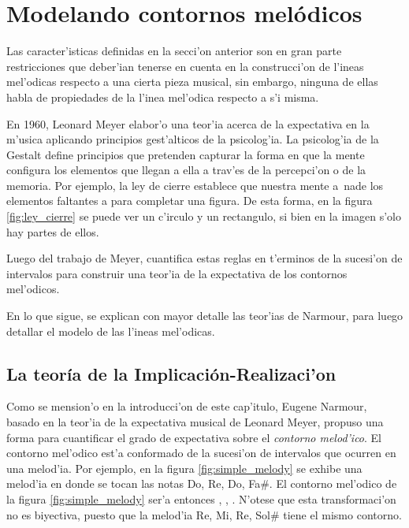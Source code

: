 \section{Modelando contornos mel\'odicos}
\label{sec:melodic_contour}
Las caracter'isticas definidas en la secci'on anterior son en gran parte restricciones que deber'ian tenerse en cuenta en la construcci'on 
de l'ineas mel'odicas respecto a una cierta pieza musical, sin embargo, ninguna de ellas habla de propiedades de la l'inea mel'odica 
respecto a s'i misma.

En 1960, Leonard Meyer elabor'o una teor'ia acerca de la expectativa en la m'usica aplicando principios gest'alticos de la psicolog'ia. La 
psicolog'ia de la Gestalt define principios que pretenden capturar la forma en que la mente configura los elementos que llegan a ella a trav'es 
de la percepci'on o de la memoria. Por ejemplo, la ley de cierre establece que nuestra mente a~nade los elementos faltantes a para completar una 
figura. De esta forma, en la figura \ref{fig:ley_cierre} se puede ver un c'irculo y un rectangulo, si bien en la imagen s'olo hay partes de ellos.

\begin{imagen}
    \width{6cm}
\end{imagen}

Luego del trabajo de Meyer, \cite{Narmour91} cuantifica estas reglas en t'erminos de la sucesi'on de intervalos para construir una teor'ia de 
la expectativa de los contornos mel'odicos. 

En lo que sigue, se explican con mayor detalle las teor'ias de Narmour, para luego detallar el modelo de las l'ineas mel'odicas.

\subsection{La teor\'ia de la Implicaci\'on-Realizaci'on}
Como se mension'o en la introducci'on de este cap'itulo, Eugene Narmour, basado en la teor'ia de la expectativa musical de Leonard Meyer, propuso una forma para cuantificar
el grado de expectativa sobre el \emph{contorno melod'ico}. El contorno mel'odico est'a conformado de la sucesi'on de intervalos que ocurren en una melod'ia. Por ejemplo, 
en la figura \ref{fig:simple_melody} se exhibe una melod'ia en donde se tocan las notas Do, Re, Do, Fa\#. 
El contorno mel'odico de la figura \ref{fig:simple_melody} ser'a entonces , , .
N'otese que esta transformaci'on no es biyectiva, puesto que la melod'ia Re, Mi, Re, Sol\# tiene el mismo contorno.

